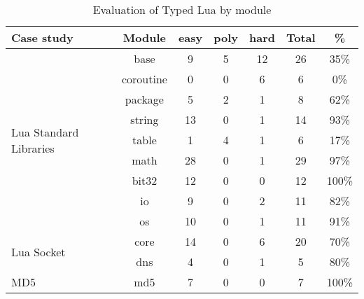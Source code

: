 \begin{table}[!ht]
\begin{center}
\begin{tabular}{|l|c|c|c|c|c|c|}
\hline
\textbf{Case study} & \textbf{Module} & \textbf{easy} & \textbf{poly} & \textbf{hard} & \textbf{Total} & \textbf{\%} \\
\hline
\multirow{9}{*}{Lua Standard Libraries}
& base & 9 & 5 & 12 & 26 & 35\% \\
\cline{2-7}
& coroutine & 0 & 0 & 6 & 6 & 0\% \\
\cline{2-7}
& package & 5 & 2 & 1 & 8 & 62\% \\
\cline{2-7}
& string & 13 & 0 & 1 & 14 & 93\% \\
\cline{2-7}
& table & 1 & 4 & 1 & 6 & 17\% \\
\cline{2-7}
& math & 28 & 0 & 1 & 29 & 97\% \\
\cline{2-7}
& bit32 & 12 & 0 & 0 & 12 & 100\% \\
\cline{2-7}
& io & 9 & 0 & 2 & 11 & 82\% \\
\cline{2-7}
& os & 10 & 0 & 1 & 11 & 91\% \\
\hline
\multirow{2}{*}{Lua Socket}
& core & 14 & 0 & 6 & 20 & 70\% \\
\cline{2-7}
& dns & 4 & 0 & 1 & 5 & 80\% \\
\hline
\multirow{1}{*}{MD5}
& md5 & 7 & 0 & 0 & 7 & 100\% \\
\hline
\end{tabular}
\end{center}
\caption{Evaluation of Typed Lua by module}
\label{tab:evalbymod}
\end{table}
